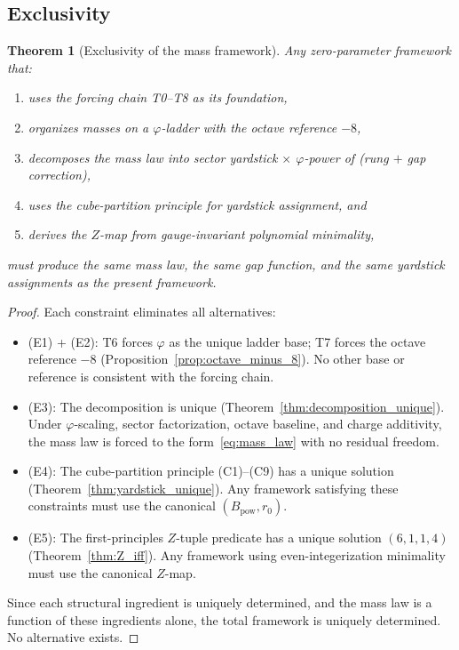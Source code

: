 \documentclass[11pt,a4paper]{article}
\newtheorem{theorem}{Theorem}[section]
\theoremstyle{definition}
\theoremstyle{remark}
\newcommand{\phig}{\varphi}
\newcommand{\Zidx}{Z}
\begin{document}
\subsection{Exclusivity}

\begin{theorem}[Exclusivity of the mass framework]
\label{thm:exclusivity}
Any zero-parameter framework that:
\begin{enumerate}[nosep,label=(E\arabic*)]
  \item uses the forcing chain T0--T8 as its foundation,
  \item organizes masses on a $\phig$-ladder with the octave reference $-8$,
  \item decomposes the mass law into sector yardstick $\times$
        $\phig$-power of (rung $+$ gap correction),
  \item uses the cube-partition principle for yardstick assignment, and
  \item derives the $\Zidx$-map from gauge-invariant polynomial minimality,
\end{enumerate}
must produce the \emph{same} mass law, the \emph{same} gap function, and the
\emph{same} yardstick assignments as the present framework.
\end{theorem}

\begin{proof}
Each constraint eliminates all alternatives:

\begin{itemize}[nosep]
  \item (E1) + (E2): T6 forces $\phig$ as the unique ladder base; T7 forces
    the octave reference $-8$ (Proposition~\ref{prop:octave_minus_8}).  No
    other base or reference is consistent with the forcing chain.

  \item (E3): The decomposition is unique (Theorem~\ref{thm:decomposition_unique}).
    Under $\phig$-scaling, sector factorization, octave baseline, and charge
    additivity, the mass law is forced to the
    form~\eqref{eq:mass_law} with no residual freedom.

  \item (E4): The cube-partition principle (C1)--(C9) has a unique solution
    (Theorem~\ref{thm:yardstick_unique}).  Any framework satisfying these
    constraints must use the canonical $(B_{\mathrm{pow}}, r_0)$.

  \item (E5): The first-principles $\Zidx$-tuple predicate has a unique
    solution $(6, 1, 1, 4)$ (Theorem~\ref{thm:Z_iff}).  Any framework using
    even-integerization minimality must use the canonical $\Zidx$-map.
\end{itemize}

\noindent
Since each structural ingredient is uniquely determined, and the mass law
is a function of these ingredients alone, the total framework is
uniquely determined.  No alternative exists.
\end{proof}
\end{document}
